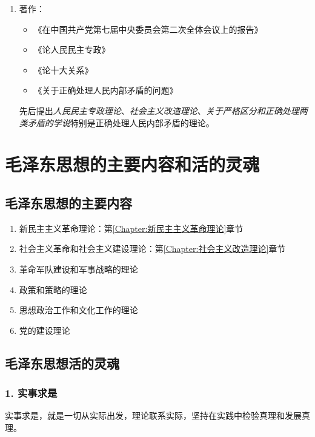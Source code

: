 \begin{enumerate}
        \item {} 著作：
        \begin{itemize}
            \item 《在中国共产党第七届中央委员会第二次全体会议上的报告》
            \item 《论人民民主专政》
            \item 《论十大关系》
            \item 《关于正确处理人民内部矛盾的问题》
        \end{itemize}
        先后提出\emph{人民民主专政理论}、\emph{社会主义改造理论}、\emph{关于严格区分和正确处理两类矛盾的学说}特别是正确处理人民内部矛盾的理论。
    \end{enumerate}


\section{毛泽东思想的主要内容和活的灵魂}

    \subsection{毛泽东思想的主要内容}
    \begin{enumerate}
        \item 新民主主义革命理论：第\ref{Chapter:新民主主义革命理论}章节
        \item 社会主义革命和社会主义建设理论：第\ref{Chapter:社会主义改造理论}章节
        \item 革命军队建设和军事战略的理论
        \item 政策和策略的理论
        \item 思想政治工作和文化工作的理论
        \item 党的建设理论
    \end{enumerate}

    \subsection{毛泽东思想活的灵魂}

    \subsubsection{1. 实事求是} 实事求是，就是一切从实际出发，理论联系实际，坚持在实践中检验真理和发展真理。

